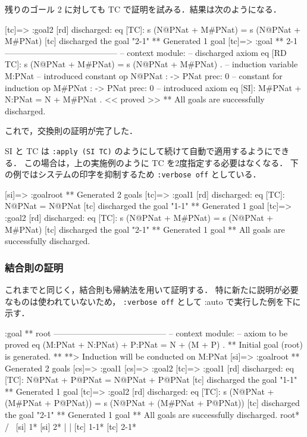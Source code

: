 \documentclass[a4paper,oneside,10pt,here]{memoir}
\newenvironment{vvtm}%
{\parskip=0pt\lineskip=0pt\begin{center}\begin{minipage}{0.8\textwidth}\begin{snugshade}}%
  {\end{snugshade}\end{minipage}\end{center}}
\begin{document}
残りのゴール 2 に対しても TC で証明を試みる．結果は次のようになる．
\begin{vvtm}
  \begin{simplev}
[tc]=> :goal{2}
[rd] discharged: 
  eq [TC]: s (N@PNat + M#PNat) = s (N@PNat + M#PNat)
[tc] discharged the goal "2-1"
** Generated 1 goal
[tc]=>
:goal { ** 2-1 -----------------------------------------
  -- context module: %
  -- discharged axiom
    eq [RD TC]: s (N@PNat + M#PNat) = s (N@PNat + M#PNat) .
  -- induction variable
    M:PNat
  -- introduced constant
    op N@PNat : -> PNat { prec: 0 }
  -- constant for induction
    op M#PNat : -> PNat { prec: 0 }
  -- introduced axiom
    eq [SI]: M#PNat + N:PNat = N + M#PNat .
} << proved >>
** All goals are successfully discharged.
  \end{simplev}
\end{vvtm}
これで，交換則の証明が完了した．

SI と TC は \verb|:apply (SI TC)| のようにして続けて自動で適用するようにできる．
この場合は，上の実施例のように TC を2度指定する必要はなくなる．
下の例ではシステムの印字を抑制するため \verb|:verbose off| としている．
\begin{vvtm}
  \begin{simplev}

[si]=> :goal{root}
** Generated 2 goals
[tc]=> :goal{1}
[rd] discharged: 
  eq [TC]: N@PNat = N@PNat
[tc] discharged the goal "1-1"
** Generated 1 goal
[tc]=> :goal{2}
[rd] discharged: 
  eq [TC]: s (N@PNat + M#PNat) = s (N@PNat + M#PNat)
[tc] discharged the goal "2-1"
** Generated 1 goal
** All goals are successfully discharged.
  \end{simplev}
\end{vvtm}

\subsubsection{結合則の証明}
これまでと同じく，結合則も帰納法を用いて証明する．
特に新たに説明が必要なものは使われていないため，
\verb|:verbose off| として :auto で実行した例を下に示す．
\begin{vvtm}
  \begin{simplev}
:goal { ** root -----------------------------------------
  -- context module: %
  -- axiom to be proved
    eq (M:PNat + N:PNat) + P:PNat = N + (M + P) .
}
** Initial goal (root) is generated. **
**> Induction will be conducted on M:PNat 
[si]=> :goal{root}
** Generated 2 goals
[cs]=> :goal{1}
[cs]=> :goal{2}
[tc]=> :goal{1}
[rd] discharged: 
  eq [TC]: N@PNat + P@PNat = N@PNat + P@PNat
[tc] discharged the goal "1-1"
** Generated 1 goal
[tc]=> :goal{2}
[rd] discharged: 
  eq [TC]: s (N@PNat + (M#PNat + P@PNat))
      = s (N@PNat + (M#PNat + P@PNat))
[tc] discharged the goal "2-1"
** Generated 1 goal
** All goals are successfully discharged.
       root*        
    /          \     
 [si] 1*    [si] 2* 
    |          |     
[tc] 1-1*  [tc] 2-1*
  \end{simplev}
\end{vvtm}
\end{document}
